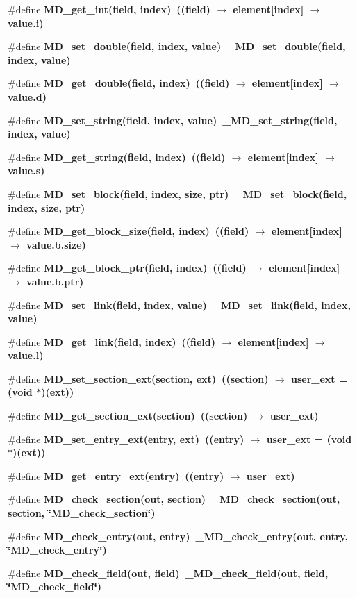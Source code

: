 \begin{CompactItemize}
\item 
\#define \bf{MD\_\-get\_\-int}(field, index)~((field) $\rightarrow$ element[index] $\rightarrow$ value.i)
\item 
\#define \bf{MD\_\-set\_\-double}(field, index, value)~\_\-MD\_\-set\_\-double(field, index, value)
\item 
\#define \bf{MD\_\-get\_\-double}(field, index)~((field) $\rightarrow$ element[index] $\rightarrow$ value.d)
\item 
\#define \bf{MD\_\-set\_\-string}(field, index, value)~\_\-MD\_\-set\_\-string(field, index, value)
\item 
\#define \bf{MD\_\-get\_\-string}(field, index)~((field) $\rightarrow$ element[index] $\rightarrow$ value.s)
\item 
\#define \bf{MD\_\-set\_\-block}(field, index, size, ptr)~\_\-MD\_\-set\_\-block(field, index, size, ptr)
\item 
\#define \bf{MD\_\-get\_\-block\_\-size}(field, index)~((field) $\rightarrow$ element[index] $\rightarrow$ value.b.size)
\item 
\#define \bf{MD\_\-get\_\-block\_\-ptr}(field, index)~((field) $\rightarrow$ element[index] $\rightarrow$ value.b.ptr)
\item 
\#define \bf{MD\_\-set\_\-link}(field, index, value)~\_\-MD\_\-set\_\-link(field, index, value)
\item 
\#define \bf{MD\_\-get\_\-link}(field, index)~((field) $\rightarrow$ element[index] $\rightarrow$ value.l)
\item 
\#define \bf{MD\_\-set\_\-section\_\-ext}(section, ext)~((section) $\rightarrow$ user\_\-ext = (void $\ast$)(ext))
\item 
\#define \bf{MD\_\-get\_\-section\_\-ext}(section)~((section) $\rightarrow$ user\_\-ext)
\item 
\#define \bf{MD\_\-set\_\-entry\_\-ext}(\bf{entry}, ext)~((\bf{entry}) $\rightarrow$ user\_\-ext = (void $\ast$)(ext))
\item 
\#define \bf{MD\_\-get\_\-entry\_\-ext}(\bf{entry})~((\bf{entry}) $\rightarrow$ user\_\-ext)
\item 
\#define \bf{MD\_\-check\_\-section}(out, section)~\_\-MD\_\-check\_\-section(out, section, \char`\"{}MD\_\-check\_\-section\char`\"{})
\item 
\#define \bf{MD\_\-check\_\-entry}(out, \bf{entry})~\_\-MD\_\-check\_\-entry(out, \bf{entry}, \char`\"{}MD\_\-check\_\-entry\char`\"{})
\item 
\#define \bf{MD\_\-check\_\-field}(out, field)~\_\-MD\_\-check\_\-field(out, field, \char`\"{}MD\_\-check\_\-field\char`\"{})
\end{CompactItemize}
